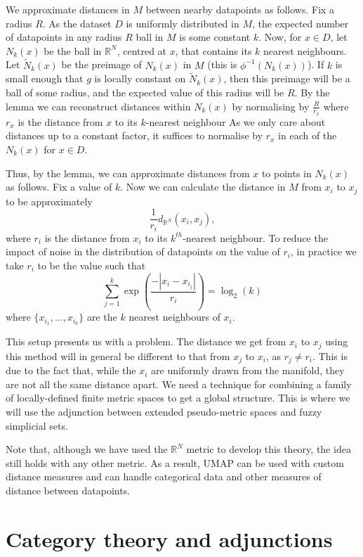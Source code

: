 \documentclass[a4paper,12pt,leqno]{article} \usepackage{amsmath}
\newcommand{\RR}{\mathbb{R}} \newcommand{\QQ}{\mathbb{Q}}
\theoremstyle{definition}
\begin{document}
We approximate distances in $M$ between nearby datapoints as follows.
Fix a radius $R$.
As the dataset $D$ is uniformly distributed in $M$, the expected number of
datapoints in any radius $R$ ball in $M$ is some constant $k$.
Now, for $x\in D$, let $N_k(x)$ be the ball in $\RR^N$, centred at $x$, that
contains its $k$ nearest neighbours.
Let $\tilde{N}_k(x)$ be the preimage of $N_k(x)$ in $M$ (this is $\phi^{-1}(N_k(x))$).
If $k$ is small enough that $g$ is locally constant on $\tilde{N}_k(x)$, then
this preimage will be a ball of some radius, and the expected value of this
radius will be $R$.
By the lemma we can reconstruct
distances within $N_k(x)$ by normalising by $\frac{R}{r_x}$ where $r_x$ is the
distance from $x$ to its $k$-nearest neighbour
As we only care about distances up to a constant factor, it suffices to
normalise by $r_x$ in each of the $N_k(x)$ for $x\in D$.

Thus, by the lemma, we can approximate distances from $x$ to points in $N_k(x)$
as follows.
Fix a value of $k$.
Now we can calculate the distance in $M$ from $x_i$ to $x_j$ to be
approximately
$$\frac{1}{r_i}d_{\RR^N}(x_i, x_j),$$
where $r_i$ is the distance from $x_i$ to its $k^{th}$-nearest neighbour.
To reduce the impact of noise in the distribution of datapoints on the value of
$r_i$, in practice we take $r_i$ to be the value such that
$$\sum_{j=1}^k\exp\left(\frac{-|x_i-x_{i_j}|}{r_i}\right) = \log_2(k)$$
where $\{x_{i_1},\ldots,x_{i_k}\}$ are the $k$ nearest neighbours of $x_i$.

This setup presents us with a problem.
The distance we get from $x_i$ to $x_j$ using this method will in general be
different to that from $x_j$ to $x_i$, as $r_j\not= r_i$.
This is due to the fact that, while the $x_i$ are uniformly drawn from the
manifold, they are not all the same distance apart.
We need a technique for combining a family of locally-defined finite metric
spaces to get a global structure.
This is where we will use the adjunction between extended pseudo-metric spaces
and fuzzy simplicial sets.

Note that, although we have used the $\RR^N$ metric to develop this theory, the
idea still holds with any other metric.
As a result, UMAP can be used with custom distance measures and can handle
categorical data and other measures of distance between datapoints.

\section{Category theory and adjunctions}
\end{document}

